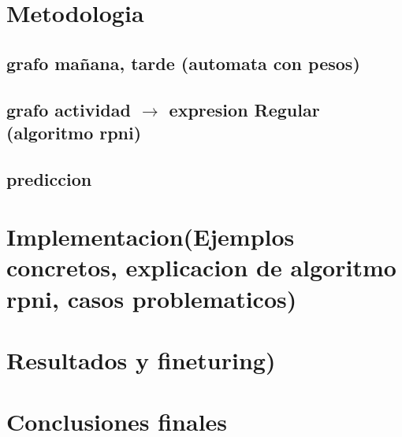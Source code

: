 \documentclass[]{article}
\begin{document}
	



\section{Metodologia}
\subsection{grafo mañana, tarde (automata con pesos)}
\subsection{grafo actividad $\rightarrow$ expresion Regular (algoritmo rpni)}
\subsection{prediccion}
\section{Implementacion(Ejemplos concretos, explicacion de algoritmo rpni, casos problematicos)}
\section{Resultados y fine\-turing)}
\section{Conclusiones finales}
\end{document}
